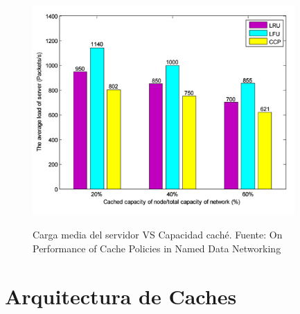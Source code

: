 \documentclass[12pt]{ociamthesis}  %
\begin{document}
\begin{figure}[!htb]
	\centering
	\includegraphics[width=10cm]{Imagenes/Paper1.1/Grafico_cargaservidor_vs_capacidadcache}\\
	\caption{ Carga media del servidor VS Capacidad caché. Fuente: On Performance of Cache Policies in Named Data Networking \cite{ran2013performance}}
	\label{cargaServidor_vs_CapacidadCS}
\end{figure}
 

\section{Arquitectura de Caches}










\end{document}
